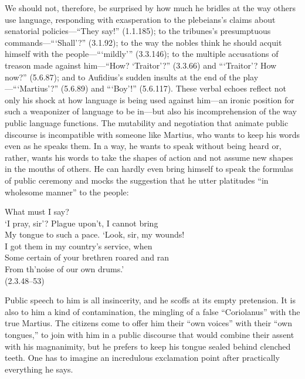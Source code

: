 We should not, therefore, be surprised by how much he bridles at the way others use language, responding with exasperation to the plebeians's claims about senatorial policies---``They say!'' (1.1.185); to the tribunes's presumptuous commands---```Shall'?'' (3.1.92); to the way the nobles think he should acquit himself with the people---```mildly''' (3.3.146); to the multiple accusations of treason made against him---``How? `Traitor'?'' (3.3.66) and ```Traitor'? How now?'' (5.6.87); and to Aufidius's sudden insults at the end of the play---```Martius'?'' (5.6.89) and ```Boy'!'' (5.6.117).
These verbal echoes reflect not only his shock at how language is being used against him---an ironic position for such a weaponizer of language to be in---but also his incomprehension of the way public language functions.
The mutability and negotiation that animate public discourse is incompatible with someone like Martius, who wants to keep his words even as he speaks them.
In a way, he wants to speak without being heard or, rather, wants his words to take the shapes of action and not assume new shapes in the mouths of others.
He can hardly even bring himself to speak the formulas of public ceremony and mocks the suggestion that he utter platitudes ``in wholesome manner'' to the people:
\begin{vq}
What must I say?\\
`I pray, sir'? Plague upon't, I cannot bring\\
My tongue to such a pace. `Look, sir, my wounds!\\
I got them in my country's service, when\\
Some certain of your brethren roared and ran\\
From th'noise of our own drums.'\\
\hfill(2.3.48--53)
\end{vq}
Public speech to him is all insincerity, and he scoffs at its empty pretension.
It is also to him a kind of contamination, the mingling of a false ``Coriolanus'' with the true Martius.
The citizens come to offer him their ``own voices'' with their ``own tongues,'' to join with him in a public discourse that would combine their assent with his magnanimity, but he prefers to keep his tongue sealed behind clenched teeth.
One has to imagine an incredulous exclamation point after practically everything he says.

